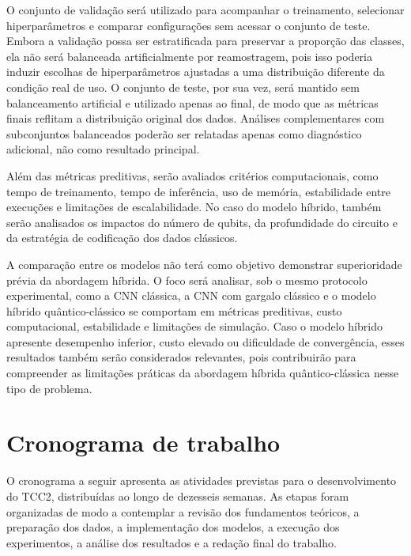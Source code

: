 \documentclass[
    12pt,
    openright,
    oneside,
    a4paper,
    english,
    brazil
]{abntex2}
\begin{document}
O conjunto de validação será utilizado para acompanhar o treinamento, selecionar hiperparâmetros e comparar configurações sem acessar o conjunto de teste. Embora a validação possa ser estratificada para preservar a proporção das classes, ela não será balanceada artificialmente por reamostragem, pois isso poderia induzir escolhas de hiperparâmetros ajustadas a uma distribuição diferente da condição real de uso. O conjunto de teste, por sua vez, será mantido sem balanceamento artificial e utilizado apenas ao final, de modo que as métricas finais reflitam a distribuição original dos dados. Análises complementares com subconjuntos balanceados poderão ser relatadas apenas como diagnóstico adicional, não como resultado principal.

Além das métricas preditivas, serão avaliados critérios computacionais, como tempo de treinamento, tempo de inferência, uso de memória, estabilidade entre execuções e limitações de escalabilidade. No caso do modelo híbrido, também serão analisados os impactos do número de qubits, da profundidade do circuito e da estratégia de codificação dos dados clássicos.

A comparação entre os modelos não terá como objetivo demonstrar superioridade prévia da abordagem híbrida. O foco será analisar, sob o mesmo protocolo experimental, como a CNN clássica, a CNN com gargalo clássico e o modelo híbrido quântico-clássico se comportam em métricas preditivas, custo computacional, estabilidade e limitações de simulação. Caso o modelo híbrido apresente desempenho inferior, custo elevado ou dificuldade de convergência, esses resultados também serão considerados relevantes, pois contribuirão para compreender as limitações práticas da abordagem híbrida quântico-clássica nesse tipo de problema.

\section{Cronograma de trabalho}
\label{sec:cronograma}

O cronograma a seguir apresenta as atividades previstas para o desenvolvimento do TCC2, distribuídas ao longo de dezesseis semanas. As etapas foram organizadas de modo a contemplar a revisão dos fundamentos teóricos, a preparação dos dados, a implementação dos modelos, a execução dos experimentos, a análise dos resultados e a redação final do trabalho.
\end{document}
